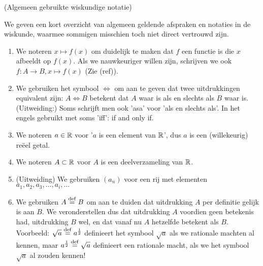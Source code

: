\documentclass{ximera}
\begin{document}
\begin{notation} (Algemeen gebruikte wiskundige notatie) 
	
	We geven een kort overzicht van algemeen geldende afspraken en notaties in de wiskunde, waarmee sommigen misschien toch niet direct vertrouwd zijn.
	\begin{enumerate}
		\item We noteren $x\mapsto f(x)$ om duidelijk te maken dat $f$ een functie is die $x$ afbeeldt op $f(x)$. Als we nauwkeuriger willen zijn, schrijven we ook $f:A\to B, x\mapsto f(x)$ (Zie (ref)).
		\item We gebruiken het symbool $\iff$ om aan te geven dat twee uitdrukkingen equivalent zijn: $A \iff B$ betekent dat $A$ waar is als en slechts als $B$ waar is. (Uitweiding:) Soms schrijft men ook 'asa' voor 'als en slechts als'. In het engels gebruikt met soms 'iff': if and only if.
		\item We noteren $a\in\mathbb{R}$ voor '$a$ is een element van $\mathbb{R}$', dus $a$ is een (willekeurig) reëel getal.
		\item We noteren $A\subset \mathbb{R}$ voor $A$ is een deelverzameling van $\mathbb{R}$.
		\item (Uitweiding) We gebruiken $(a_n)$ voor een rij met elementen $a_1,a_2,a_3,\dots,a_i,\dots$ 
		\item We gebruiken $A\overset{\mathrm{def}}{=} B$ om aan te duiden dat uitdrukking $A$ per definitie gelijk is aan $B$. We veronderstellen dus dat uitdrukking $A$ voordien geen betekenis had, uitdrukking $B$ wel, en dat vanaf nu $A$ hetzelfde betekent als $B$. Voorbeeld: $\sqrt{a}\overset{\mathrm{def}}{=} a^{\frac12}$ definieert het symbool $\sqrt{a}$ als we rationale machten al kennen, maar $a^{\frac12} \overset{\mathrm{def}}{=} \sqrt{a}$ definieert een rationale macht, als we het symbool $\sqrt{a}$ al zouden kennen!
	\end{enumerate}
\end{notation}
\end{document}
